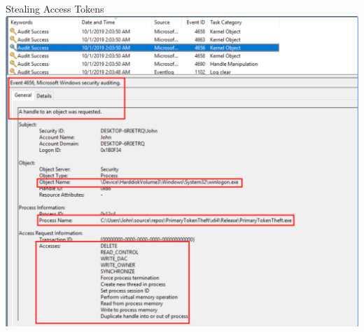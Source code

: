 \documentclass[nobackground,dvipsnames,table,aspectratio=169]{beamer}
\begin{document}
\begin{frame}{Stealing Access Tokens}
    \centering
    \includegraphics[height=0.85\textheight]{stealing-access-tokens}
\end{frame}
\end{document}
